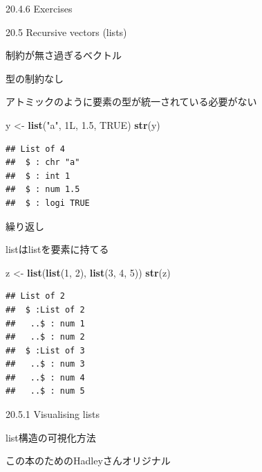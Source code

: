 \documentclass[ignorenonframetext,]{beamer}
\newenvironment{Shaded}{\begin{snugshade}}{\end{snugshade}}
\newcommand{\KeywordTok}[1]{\textcolor[rgb]{0.13,0.29,0.53}{\textbf{#1}}}
\newcommand{\DecValTok}[1]{\textcolor[rgb]{0.00,0.00,0.81}{#1}}
\newcommand{\FloatTok}[1]{\textcolor[rgb]{0.00,0.00,0.81}{#1}}
\newcommand{\StringTok}[1]{\textcolor[rgb]{0.31,0.60,0.02}{#1}}
\newcommand{\OtherTok}[1]{\textcolor[rgb]{0.56,0.35,0.01}{#1}}
\newcommand{\NormalTok}[1]{#1}
\begin{document}
\begin{frame}{20.4.6 Exercises}

\end{frame}

\begin{frame}{20.5 Recursive vectors (lists)}

制約が無さ過ぎるベクトル

\end{frame}

\begin{frame}[fragile]{型の制約なし}

アトミックのように要素の型が統一されている必要がない

\begin{Shaded}
\begin{Highlighting}[]
\NormalTok{y <-}\StringTok{ }\KeywordTok{list}\NormalTok{(}\StringTok{"a"}\NormalTok{, 1L, }\FloatTok{1.5}\NormalTok{, }\OtherTok{TRUE}\NormalTok{)}
\KeywordTok{str}\NormalTok{(y)}
\end{Highlighting}
\end{Shaded}

\begin{verbatim}
## List of 4
##  $ : chr "a"
##  $ : int 1
##  $ : num 1.5
##  $ : logi TRUE
\end{verbatim}

\end{frame}

\begin{frame}[fragile]{繰り返し}

listはlistを要素に持てる

\begin{Shaded}
\begin{Highlighting}[]
\NormalTok{z <-}\StringTok{ }\KeywordTok{list}\NormalTok{(}\KeywordTok{list}\NormalTok{(}\DecValTok{1}\NormalTok{, }\DecValTok{2}\NormalTok{), }\KeywordTok{list}\NormalTok{(}\DecValTok{3}\NormalTok{, }\DecValTok{4}\NormalTok{, }\DecValTok{5}\NormalTok{))}
\KeywordTok{str}\NormalTok{(z)}
\end{Highlighting}
\end{Shaded}

\begin{verbatim}
## List of 2
##  $ :List of 2
##   ..$ : num 1
##   ..$ : num 2
##  $ :List of 3
##   ..$ : num 3
##   ..$ : num 4
##   ..$ : num 5
\end{verbatim}

\end{frame}

\begin{frame}{20.5.1 Visualising lists}

list構造の可視化方法

この本のためのHadleyさんオリジナル

\end{frame}
\end{document}

